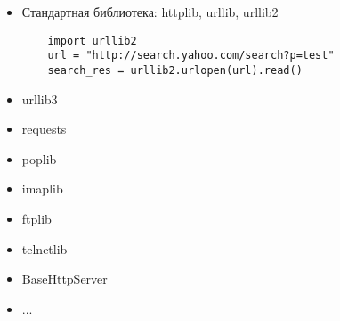 \documentclass{article}
\begin{document}
\newpage

\begin{itemize}
\item Стандартная библиотека: httplib, urllib, urllib2
{
\vspace{15pt}
\begin{lstlisting}
	import urllib2
	url = "http://search.yahoo.com/search?p=test"
	search_res = urllib2.urlopen(url).read()
\end{lstlisting}
}
\item urllib3
\item requests
\end{itemize}

\newpage

\begin{itemize}
\item poplib
\item imaplib
\item ftplib
\item telnetlib
\item BaseHttpServer
\item ...
\end{itemize}

\newpage

\end{document}
